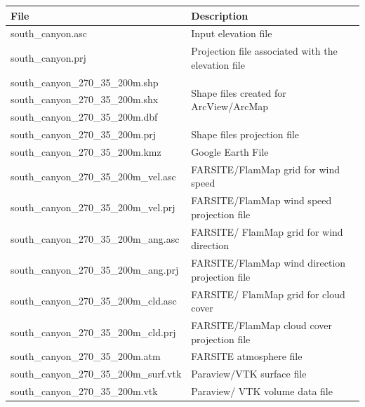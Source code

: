 \documentclass[12pt]{article}
\begin{document}
\begin{center}


\begin{tabular}{|l|l|} 
\hline
\textbf{File}                          & \textbf{Description}                                     \\ 
\hline
south\_canyon.asc                      & Input elevation file                                     \\ 
\hline
south\_canyon.prj                      & Projection file associated with the elevation file       \\ 
\hline
south\_canyon\_270\_35\_200m.shp       & \multirow{3}{*}{Shape files created for ArcView/ArcMap}  \\ 
\cline{1-1}
south\_canyon\_270\_35\_200m.shx       &                                                          \\ 
\cline{1-1}
south\_canyon\_270\_35\_200m.dbf       &                                                          \\ 
\hline
south\_canyon\_270\_35\_200m.prj       & Shape files projection file                            \\ 
\hline
south\_canyon\_270\_35\_200m.kmz       & Google Earth File                                        \\ 
\hline
south\_canyon\_270\_35\_200m\_vel.asc  & FARSITE/FlamMap grid for wind speed                      \\ 
\hline
south\_canyon\_270\_35\_200m\_vel.prj  & FARSITE/FlamMap wind speed projection file               \\ 
\hline
south\_canyon\_270\_35\_200m\_ang.asc  & FARSITE/ FlamMap grid for wind direction                 \\ 
\hline
south\_canyon\_270\_35\_200m\_ang.prj  & FARSITE/FlamMap wind direction projection file           \\ 
\hline
south\_canyon\_270\_35\_200m\_cld.asc  & FARSITE/ FlamMap grid for cloud cover                    \\ 
\hline
south\_canyon\_270\_35\_200m\_cld.prj  & FARSITE/FlamMap cloud cover projection file              \\ 
\hline
south\_canyon\_270\_35\_200m.atm       & FARSITE atmosphere file                                  \\ 
\hline
south\_canyon\_270\_35\_200m\_surf.vtk & Paraview/VTK surface file                                \\ 
\hline
south\_canyon\_270\_35\_200m.vtk       & Paraview/ VTK volume data file                           \\
\hline
\end{tabular}
\end{center}
\end{document}
